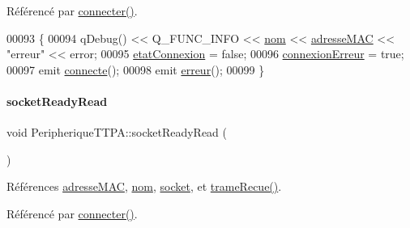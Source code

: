Référencé par \hyperlink{class_peripherique_t_t_p_a_a8afa92f7c3ae6e1edc30f5c8b386af81}{connecter()}.


\begin{DoxyCode}
00093 \{
00094     qDebug() << Q\_FUNC\_INFO << \hyperlink{class_peripherique_t_t_p_a_afafe3566b4b5357819811218b9a4244f}{nom} << \hyperlink{class_peripherique_t_t_p_a_a444063230c83cf81eff8a3a55736f2cf}{adresseMAC} << \textcolor{stringliteral}{"erreur"} << error;
00095     \hyperlink{class_peripherique_t_t_p_a_a3aaac9f045cc038777895afe18411e58}{etatConnexion} = \textcolor{keyword}{false};
00096     \hyperlink{class_peripherique_t_t_p_a_a9602c4662641984ea44bf6caaac6e94c}{connexionErreur} = \textcolor{keyword}{true};
00097     emit \hyperlink{class_peripherique_t_t_p_a_ae95f1fe6bb1908b5eb2d34a469f7f873}{connecte}();
00098     emit \hyperlink{class_peripherique_t_t_p_a_a7a31d9f923cc71a42d0dab80d9332eb6}{erreur}();
00099 \}
\end{DoxyCode}
\mbox{\label{class_peripherique_t_t_p_a_a4e1d676e59b293161a40ee6428a79871}} 
\paragraph{\texorpdfstring{socket\+Ready\+Read}{socketReadyRead}}
{\footnotesize\ttfamily void Peripherique\+T\+T\+P\+A\+::socket\+Ready\+Read (\begin{DoxyParamCaption}{ }\end{DoxyParamCaption})\hspace{0.3cm}{\ttfamily [slot]}}



Références \hyperlink{class_peripherique_t_t_p_a_a444063230c83cf81eff8a3a55736f2cf}{adresse\+M\+AC}, \hyperlink{class_peripherique_t_t_p_a_afafe3566b4b5357819811218b9a4244f}{nom}, \hyperlink{class_peripherique_t_t_p_a_ab66f30984a7f9fa17fd28391efe968a9}{socket}, et \hyperlink{class_peripherique_t_t_p_a_aaa8699b83c9659c874a0d066ea633e45}{trame\+Recue()}.



Référencé par \hyperlink{class_peripherique_t_t_p_a_a8afa92f7c3ae6e1edc30f5c8b386af81}{connecter()}.


